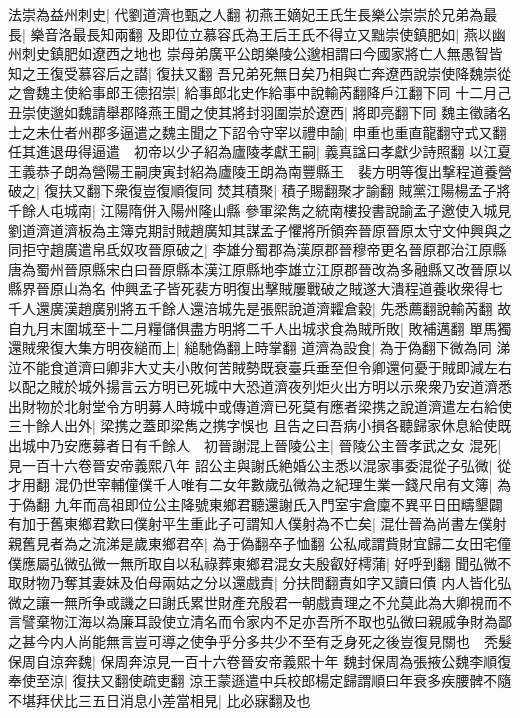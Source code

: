 法崇為益州刺史|{
	代劉道濟也甄之人翻}
初燕王嫡妃王氏生長樂公崇崇於兄弟為最長|{
	樂音洛最長知兩翻}
及即位立慕容氏為王后王氏不得立又黜崇使鎮肥如|{
	燕以幽州刺史鎮肥如遼西之地也}
崇母弟廣平公朗樂陵公邈相謂曰今國家將亡人無愚智皆知之王復受慕容后之譛|{
	復扶又翻}
吾兄弟死無日矣乃相與亡奔遼西說崇使降魏崇從之會魏主使給事郎王德招崇|{
	給事郎北史作給事中說輸芮翻降戶江翻下同}
十二月己丑崇使邈如魏請舉郡降燕王聞之使其將封羽圍崇於遼西|{
	將即亮翻下同}
魏主徵諸名士之未仕者州郡多逼遣之魏主聞之下詔令守宰以禮申諭|{
	申重也重直龍翻守式又翻}
任其進退毋得逼遣　初帝以少子紹為廬陵孝獻王嗣|{
	義真諡曰孝獻少詩照翻}
以江夏王義恭子朗為營陽王嗣庚寅封紹為廬陵王朗為南豐縣王　裴方明等復出撃程道養營破之|{
	復扶又翻下衆復豈復順復同}
焚其積聚|{
	積子賜翻聚才諭翻}
賊黨江陽楊孟子將千餘人屯城南|{
	江陽隋併入陽州隆山縣}
參軍梁雋之統南樓投書說諭孟子邀使入城見劉道濟道濟板為主簿克期討賊趙廣知其謀孟子懼將所領奔晉原晉原太守文仲興與之同拒守趙廣遣帛氐奴攻晉原破之|{
	李雄分蜀郡為漢原郡晉穆帝更名晉原郡治江原縣唐為蜀州晉原縣宋白曰晉原縣本漢江原縣地李雄立江原郡晉改為多融縣又改晉原以縣界晉原山為名}
仲興孟子皆死裴方明復出擊賊屢戰破之賊遂大潰程道養收衆得七千人還廣漢趙廣别將五千餘人還涪城先是張熙說道濟糶倉穀|{
	先悉薦翻說輸芮翻}
故自九月末圍城至十二月糧儲俱盡方明將二千人出城求食為賊所敗|{
	敗補邁翻}
單馬獨還賊衆復大集方明夜縋而上|{
	縋馳偽翻上時掌翻}
道濟為設食|{
	為于偽翻下微為同}
涕泣不能食道濟曰卿非大丈夫小敗何苦賊勢既衰臺兵垂至但令卿還何憂于賊即減左右以配之賊於城外揚言云方明已死城中大恐道濟夜列炬火出方明以示衆衆乃安道濟悉出財物於北射堂令方明募人時城中或傳道濟已死莫有應者梁携之說道濟遣左右給使三十餘人出外|{
	梁携之蓋即梁雋之携字悞也}
且告之曰吾病小損各聽歸家休息給使既出城中乃安應募者日有千餘人　初晉謝混上晉陵公主|{
	晉陵公主晉孝武之女}
混死|{
	見一百十六卷晉安帝義熙八年}
詔公主與謝氏絶婚公主悉以混家事委混從子弘微|{
	從才用翻}
混仍世宰輔僮僕千人唯有二女年數歲弘微為之紀理生業一錢尺帛有文簿|{
	為于偽翻}
九年而高祖即位公主降號東鄉君聽還謝氏入門室宇倉廩不異平日田疇墾闢有加于舊東鄉君歎曰僕射平生重此子可謂知人僕射為不亡矣|{
	混仕晉為尚書左僕射}
親舊見者為之流涕是歲東鄉君卒|{
	為于偽翻卒子恤翻}
公私咸謂貲財宜歸二女田宅僮僕應屬弘微弘微一無所取自以私祿葬東鄉君混女夫殷叡好樗蒲|{
	好呼到翻}
聞弘微不取財物乃奪其妻妹及伯母兩姑之分以還戲責|{
	分扶問翻責如字又讀曰債}
内人皆化弘微之讓一無所争或譏之曰謝氏累世財產充殷君一朝戲責理之不允莫此為大卿視而不言譬棄物江海以為廉耳設使立清名而令家内不足亦吾所不取也弘微曰親戚争財為鄙之甚今内人尚能無言豈可導之使争乎分多共少不至有乏身死之後豈復見關也　秃髮保周自涼奔魏|{
	保周奔涼見一百十六卷晉安帝義熙十年}
魏封保周為張掖公魏李順復奉使至涼|{
	復扶又翻使疏吏翻}
涼王蒙遜遣中兵校郎楊定歸謂順曰年衰多疾腰髀不隨不堪拜伏比三五日消息小差當相見|{
	比必寐翻及也}
